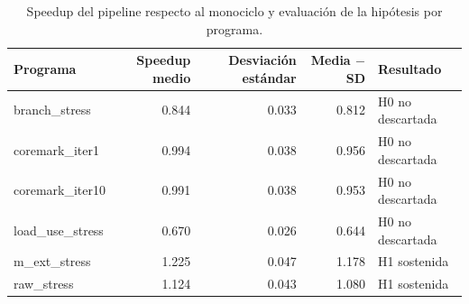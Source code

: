 \begin{table}[htbp]
\centering
\caption{Speedup del pipeline respecto al monociclo y evaluación de la hipótesis por programa.}
\label{tab:speedup}
\begin{tabular}{lrrrl}
\toprule
Programa & Speedup medio & Desviación estándar & Media $-$ SD & Resultado \\
\midrule
branch\_stress & 0.844 & 0.033 & 0.812 & H0 no descartada \\
coremark\_iter1 & 0.994 & 0.038 & 0.956 & H0 no descartada \\
coremark\_iter10 & 0.991 & 0.038 & 0.953 & H0 no descartada \\
load\_use\_stress & 0.670 & 0.026 & 0.644 & H0 no descartada \\
m\_ext\_stress & 1.225 & 0.047 & 1.178 & H1 sostenida \\
raw\_stress & 1.124 & 0.043 & 1.080 & H1 sostenida \\
\bottomrule
\end{tabular}
\end{table}
